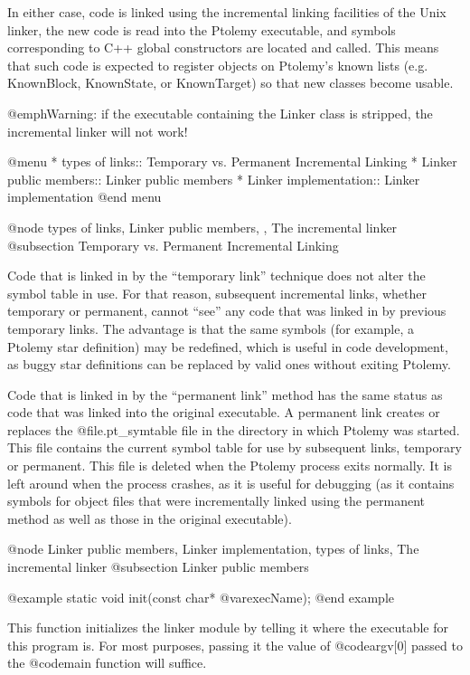 In either case, code is linked using the incremental linking facilities
of the Unix linker, the new code is read into the Ptolemy executable,
and symbols corresponding to C++ global constructors are located and called.
This means that such code is expected to register objects on Ptolemy's
known lists (e.g. KnownBlock, KnownState, or KnownTarget) so that new
classes become usable.

@emph{Warning:} if the executable containing the Linker class is
stripped, the incremental linker will not work!

@menu
* types of links::  Temporary vs. Permanent Incremental Linking
* Linker public members::  Linker public members
* Linker implementation::  Linker implementation
@end menu

@node types of links, Linker public members,  , The incremental linker
@subsection Temporary vs. Permanent Incremental Linking

Code that is linked in by the ``temporary link'' technique does not
alter the symbol table in use.  For that reason, subsequent incremental
links, whether temporary or permanent, cannot ``see'' any code that
was linked in by previous temporary links.  The advantage is that the
same symbols (for example, a Ptolemy star definition) may be redefined,
which is useful in code development, as buggy star definitions can be
replaced by valid ones without exiting Ptolemy.

Code that is linked in by the ``permanent link'' method has the same
status as code that was linked into the original executable.  A
permanent link creates or replaces the @file{.pt_symtable} file in
the directory in which Ptolemy was started.  This file contains the
current symbol table for use by subsequent links, temporary or
permanent.  This file is deleted when the Ptolemy process exits
normally.  It is left around when the process crashes, as it is useful
for debugging (as it contains symbols for object files that were
incrementally linked using the permanent method as well as those in
the original executable).

@node Linker public members, Linker implementation, types of links, The incremental linker
@subsection Linker public members


@example
static void init(const char* @var{execName});
@end example

This function initializes the linker module by telling it where the
executable for this program is.  For most purposes, passing it the
value of @code{argv[0]} passed to the @code{main} function will
suffice.

